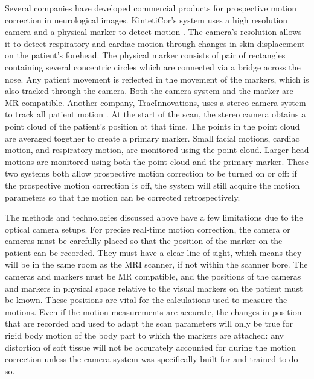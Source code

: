 Several companies have developed commercial products for prospective motion correction in neurological images. KintetiCor's system uses a high resolution camera and a physical marker to detect motion \cite{kineticor}. The camera's resolution allows it to detect respiratory and cardiac motion through changes in skin displacement on the patient's forehead. The physical marker consists of pair of rectangles containing several concentric circles which are connected via a bridge across the nose. Any patient movement is reflected in the movement of the markers, which is also tracked through the camera. Both the camera system and the marker are MR compatible. Another company, TracInnovations, uses a stereo camera system to track all patient motion \cite{tracinnovations}. At the start of the scan, the stereo camera obtains a point cloud of the patient's position at that time. The points in the point cloud are averaged together to create a primary marker. Small facial motions, cardiac motion, and respiratory motion, are monitored using the point cloud. Larger head motions are monitored using both the point cloud and the primary marker. These two systems both allow prospective motion correction to be turned on or off: if the prospective motion correction is off, the system will still acquire the motion parameters so that the motion can be corrected retrospectively.

The methods and technologies discussed above have a few limitations due to the optical camera setups. For precise real-time motion correction, the camera or cameras must be carefully placed so that the position of the marker on the patient can be recorded. They must have a clear line of sight, which means they will be in the same room as the MRI scanner, if not within the scanner bore. The cameras and markers must be MR compatible, and the positions of the cameras and markers in physical space relative to the visual markers on the patient must be known. These positions are vital for the calculations used to measure the motions. Even if the motion measurements are accurate, the changes in position that are recorded and used to adapt the scan parameters will only be true for rigid body motion of the body part to which the markers are attached: any distortion of soft tissue will not be accurately accounted for during the motion correction unless the camera system was specifically built for and trained to do so. 

